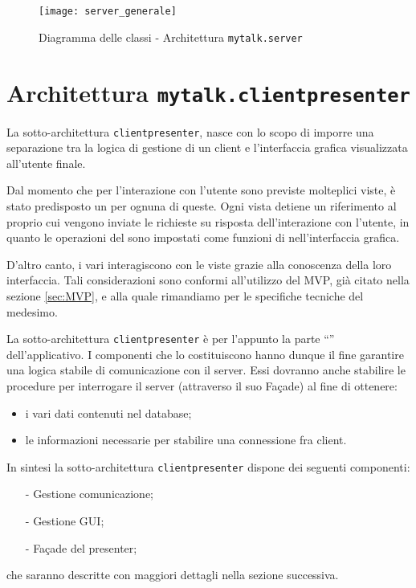 \begin{figure}[H]
  \centering
  \texttt{[image: server\_generale]}
  \caption{Diagramma delle classi - Architettura \texttt{mytalk.server}}\label{fig:server_generale}
\end{figure}
\clearpage

\section{Architettura \texttt{mytalk.clientpresenter}}\label{sec:clientpresenter}
La sotto-architettura \texttt{clientpresenter}, nasce con lo scopo di imporre una separazione tra la logica di gestione di un client e l'interfaccia grafica visualizzata all'utente finale.

Dal momento che per l'interazione con l'utente sono previste molteplici viste, è stato predisposto un  per ognuna di queste. Ogni vista detiene un riferimento al proprio  cui vengono inviate le richieste su risposta dell'interazione con l'utente, in quanto le operazioni del  sono impostati come funzioni di  nell'interfaccia grafica.

D'altro canto, i vari  interagiscono con le viste grazie alla conoscenza della loro interfaccia. Tali considerazioni sono conformi all'utilizzo del  MVP, già citato nella sezione \ref{sec:MVP}, e alla quale rimandiamo per le specifiche tecniche del medesimo. 

La sotto-architettura \texttt{clientpresenter} è per l'appunto la parte ``'' dell'applicativo. I componenti che lo costituiscono hanno dunque il fine garantire una logica stabile di comunicazione con il server. Essi dovranno anche stabilire le procedure per interrogare il server (attraverso il suo Façade) al fine di ottenere:
\begin{itemize}
  \item i vari dati contenuti nel database;
  \item le informazioni necessarie per stabilire una connessione fra client.
\end{itemize}


In sintesi la sotto-architettura \texttt{clientpresenter} dispone dei seguenti componenti:
\begin{itemize}[noitemsep,nolistsep]
	\item[-] Gestione comunicazione;
	\item[-] Gestione GUI;
	\item[-] Façade del presenter;
\end{itemize}
che saranno descritte con maggiori dettagli nella sezione successiva.


